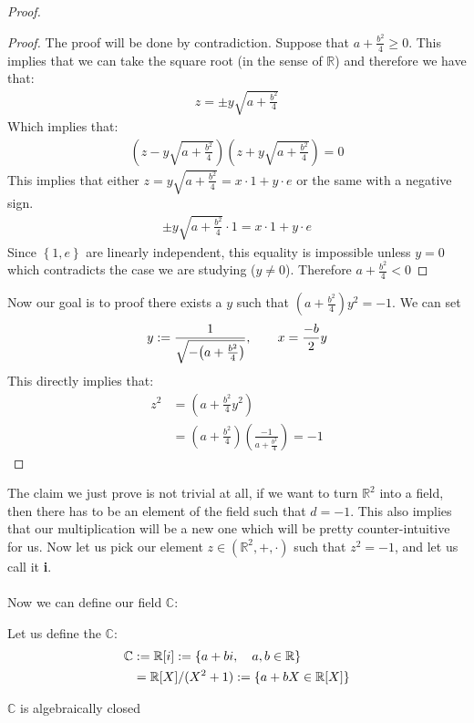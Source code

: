 \begin{proof}
\begin{proof}
		
	    The proof will be done by contradiction. Suppose that $a + \frac{b^2}{4} \geq 0$. This implies that we can take the square root (in the sense of $ \mathbb{R}$) and therefore we have that:
		\begin{align*} 
			z =  \pm y\sqrt{a + \frac{b^2}{4}}
		\end{align*}
		Which implies that:
		\begin{align*} 
			\left(z - y\sqrt{a + \frac{b^2}{4}}\right)\left(z + y\sqrt{a + \frac{b^2}{4}}\right) = 0
		\end{align*}
		This implies that either $z = y \sqrt{a + \frac{b^2}{4}} = x \cdot 1 + y \cdot  e$ or the same with a negative sign.
		\begin{align*} 
			\pm y\sqrt{a + \frac{b^2}{4}}  \cdot  1=  x \cdot  1 + y \cdot  e
		\end{align*}
		Since $\left\{1, e\right\}$ are linearly independent, this equality is impossible unless $y = 0$ which contradicts the case we are studying ($y \neq 0$). Therefore $a + \frac{b^2}{4} < 0$
		\end{proof}
		Now our goal is to proof there exists a $y$ such that $\left(a + \frac{b^2}{4}\right)y^2 = -1$. We can set
		\begin{align*} 
			y := \frac{1}{\sqrt{-\left(a + \frac{b^2}{4}\right)}}, \mathspace \mathspace x = \frac{-b}{2}y
		\end{align*}
		This directly implies that:
		\begin{align*} 
			z^2 &= \left(a + \frac{b^2}{4}y^2\right)\\
				&= \left(a + \frac{b^2}{4}\right)\left(\frac{-1}{a + \frac{b^2}{4}}\right) = -1
		\end{align*}

\end{proof}
The claim we just prove is not trivial at all, if we want to turn $\mathbb{R}^{2}$ into a field, then there has to be an element of the field such that $d = -1$. This also implies that our multiplication will be a new one which will be pretty counter-intuitive for us. Now let us pick our element $z \in \left(\mathbb{R}^{2}, + , \cdot \right)$ such that $z^2 = -1$, and let us call it \textbf{i}.\\
$ $\\
Now we can define our field $\mathbb{C}$:
\begin{definition}

	Let us define the  $\mathbb{C}$:
	\begin{align*} 
		\mathbb{C} &:= \mathbb{R}[i] := \left\{a + bi, \mathspace a, b \in \mathbb{R}\right\}\\
				   &=  \mathbb{R}[X]/(X^2+1) := \left\{a + bX \in \mathbb{R}[X]\right\}\\
	\end{align*}
\end{definition}
	$\mathbb{C}$ is algebraically closed


